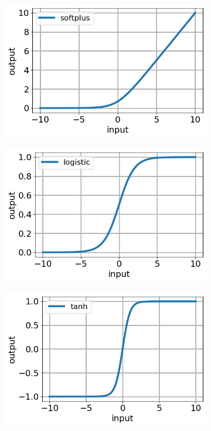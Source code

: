 \documentclass[12pt]{article}
\newcommand{\nhgactfuncheight}{3.5cm}
\newcommand{\nhgactfuncwidth}{0.48\linewidth}
\begin{document}
\begin{figure}[!h]
  \centering
  \begin{subfigure}[t]{\nhgactfuncwidth}
    \centering
    \includegraphics[totalheight=\nhgactfuncheight]{Figures/actfuncs/softplus.png}
  \end{subfigure}
  \begin{subfigure}[t]{\nhgactfuncwidth}
    \centering
    \includegraphics[totalheight=\nhgactfuncheight]{Figures/actfuncs/logistic.png}
  \end{subfigure}
  \begin{subfigure}[t]{\nhgactfuncwidth}
    \centering   
    \includegraphics[totalheight=\nhgactfuncheight]{Figures/actfuncs/tanh.png}

\end{subfigure}
\end{figure}
\end{document}
